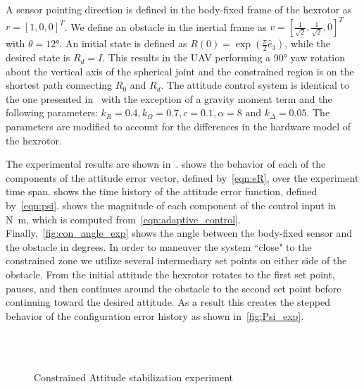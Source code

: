 \documentclass[10pt,fleqn]{IJCAS}  %
\begin{document}
\begin{multicols}{2}
A sensor pointing direction is defined in the body-fixed frame of the hexrotor as \( r = [1,0,0]^T \).
We define an obstacle in the inertial frame as \( v = [\frac{1}{\sqrt{2}}, \frac{1}{\sqrt{2}}, 0]^T \) with \( \theta = \ang{12} \).
An initial state is defined as \(R(0) = \exp( \frac{\pi}{2} \hat{e}_3) \), while the desired state is \(R_d =I \).
This results in the UAV performing a \ang{90} yaw rotation about the vertical axis of the spherical joint and the constrained region is on the shortest path connecting $R_0$ and $R_d$. 
The attitude control system is identical to the one presented in~ with the exception of a gravity moment term and the following parameters: \(k_R = 0.4, k_\Omega = 0.7 ,c = 0.1 , \alpha = 8 \text{ and } k_\Delta = 0.05\).
The parameters are modified to account for the differences in the hardware model of the hexrotor.

The experimental results are shown in~.
 shows the behavior of each of the components of the attitude error vector, defined by~\cref{eqn:eR}, over the experiment time span.
 shows the time history of the attitude error function, defined by~\cref{eqn:psi}.
 shows the magnitude of each component of the control input in \si{\newton\meter}, which is computed from~\cref{eqn:adaptive_control}.
Finally,~\cref{fig:con_angle_exp} shows the angle between the body-fixed sensor and the obstacle in degrees.
In order to maneuver the system ``close" to the constrained zone we utilize several intermediary set points on either side of the obstacle.
From the initial attitude the hexrotor rotates to the first set point, pauses, and then continues around the obstacle to the second set point before continuing toward the desired attitude.
As a result this creates the stepped behavior of the configuration error history as shown in~\cref{fig:Psi_exp}.

\end{multicols}
\begin{figure}[H]
    \centering 
    ~
    ~
    \\
    ~
    \caption{Constrained Attitude stabilization experiment}
    \label{fig:exp} 
\end{figure}
\end{document}
